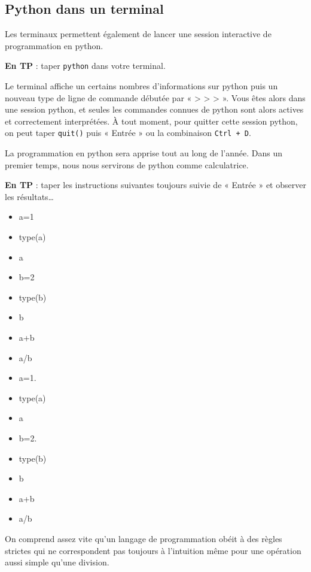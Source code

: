 
\subsection{Python dans un terminal}
\label{Python dans un terminal}

Les terminaux permettent également de lancer une session interactive de programmation en python.

\textbf{En TP} : taper \texttt{python} dans votre terminal.

Le terminal affiche un certains nombres d'informations sur python puis un nouveau type de ligne de commande débutée par « > > > ». Vous êtes alors dans une session python, et seules les commandes connues de python sont alors actives et correctement interprétées. À tout moment, pour quitter cette session python, on peut taper \texttt{quit()} puis « Entrée » ou la combinaison \texttt{Ctrl + D}.

La programmation en python sera apprise tout au long de l'année. Dans un premier temps, nous nous servirons de python comme calculatrice.

\newpage
\textbf{En TP} : taper les instructions suivantes toujours suivie de « Entrée » et observer les résultats\dots

\ttfamily
\begin{itemize}
 \item[] a=1
 \item[] type(a)
 \item[] a
 \item[] b=2
 \item[] type(b)
 \item[] b
 \item[] a+b
 \item[] a/b
 \item[] a=1.
 \item[] type(a)
 \item[] a
 \item[] b=2.
 \item[] type(b)
 \item[] b
 \item[] a+b
 \item[] a/b
\end{itemize}

\rmfamily

On comprend assez vite qu'un langage de programmation obéit à des règles strictes qui ne correspondent pas toujours à l'intuition même pour une opération aussi simple qu'une division.

